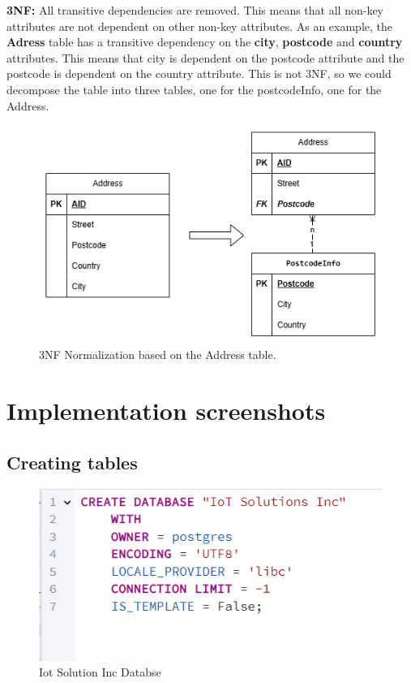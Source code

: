 \documentclass{article}
\begin{document}
\textbf{3NF:} All transitive dependencies are removed. This means that all non-key attributes are not dependent on other non-key attributes. As an example, the \textbf{Adress} table has a transitive dependency on the \textbf{city}, \textbf{postcode} and \textbf{country} attributes. This means that city is dependent on the postcode attribute and the postcode is dependent on the country attribute. This is not 3NF, so we could decompose the table into three tables, one for the postcodeInfo, one for the Address. 
\begin{figure}[H]
\centering
\includegraphics[width=\linewidth]{img/3nf.png}
\caption{3NF Normalization based on the Address table.}
\end{figure}


\newpage
\section{Implementation screenshots}


\subsection{Creating tables}
\begin{figure}[H]
\centering
\includegraphics[width=\linewidth]{img/iot_solution_inc_db.png}
\caption{Iot Solution Inc Databse}
\end{figure}
\end{document}
